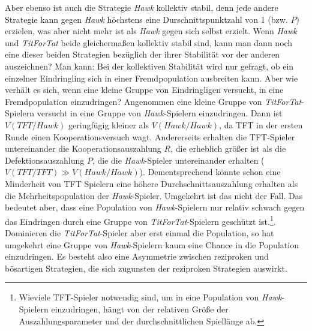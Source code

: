 Aber ebenso ist auch die Strategie {\em Hawk} kollektiv stabil, denn jede
andere Strategie kann gegen {\em Hawk} höchstens eine Durschnittspunktzahl von
1 (bzw. $P$) erzielen, was aber nicht mehr ist als {\em Hawk} gegen sich selbst
erzielt. Wenn {\em Hawk} und {\em TitForTat} beide gleichermaßen kollektiv
stabil sind, kann man dann noch eine dieser beiden Strategien bezüglich der
ihrer Stabilität vor der anderen auszeichnen? Man kann: Bei der
kollektiven Stabilität wird nur gefragt, ob ein einzelner Eindringling sich in
einer Fremdpopulation ausbreiten kann. Aber wie verhält es sich, wenn eine
kleine Gruppe von Eindringligen versucht, in eine Fremdpopulation einzudringen?
Angenommen eine kleine Gruppe von {\em TitForTat}-Spielern versucht in eine
Gruppe von {\em Hawk}-Spielern einzudringen. Dann ist $V(TFT/Hawk)$ geringfügig
kleiner als $V(Hawk/Hawk)$, da TFT in der ersten Runde einen
Kooperationsversuch wagt. Andererseits erhalten die TFT-Spieler untereinander
die Kooperationsauszahlung $R$, die erheblich größer ist als die
Defektionsauszahlung $P$, die die {\em Hawk}-Spieler untereinander erhalten
($V(TFT/TFT) \gg V(Hawk/Hawk) $). Dementsprechend könnte schon eine Minderheit
von TFT Spielern eine höhere Durchschnittsauszahlung erhalten als die 
Mehrheitspopulation der {\em Hawk}-Spieler. Umgekehrt ist das nicht der Fall. 
Das bedeutet aber, dass eine Population von {\em Hawk}-Spielern nur relativ
schwach gegen das Eindringen durch eine Gruppe von {\em TitForTat}-Spielern
geschützt ist.\footnote{Wieviele TFT-Spieler notwendig sind, um in eine
Population von {\em Hawk}-Spielern einzudringen, hängt von der relativen Größe
der Auszahlungsparameter und der durchschnittlichen Spiellänge ab.}. Dominieren
die {\em TitForTat}-Spieler aber erst einmal die Population, so hat 
umgekehrt eine Gruppe von {\em Hawk}-Spielern kaum eine Chance 
in die Population einzudringen. Es besteht also eine Asymmetrie zwischen
reziproken und bösartigen Strategien, die sich zugunsten der reziproken
Strategien auswirkt.


